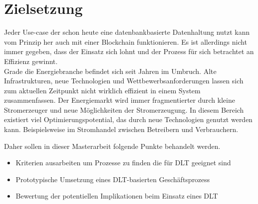 \section{Zielsetzung}

Jeder Use-case der schon heute eine datenbankbasierte Datenhaltung nutzt kann vom Prinzip her auch mit einer Blockchain funktionieren. Es ist allerdings nicht immer gegeben, dass der Einsatz sich lohnt und der Prozess für sich betrachtet an Effizienz gewinnt.\\

Grade die Energiebranche befindet sich seit Jahren im Umbruch. Alte Infrastrukturen, neue Technologien und Wettbewerbsanforderungen lassen sich zum aktuellen Zeitpunkt nicht wirklich effizient in einem System zusammenfassen. Der Energiemarkt wird immer fragmentierter durch kleine Stromerzeuger und neue Möglichkeiten der Stromerzeugung. In diesem Bereich existiert viel Optimierungspotential, das durch neue Technologien genutzt werden kann. Beispielsweise im Stromhandel zwischen Betreibern und Verbrauchern.

Daher sollen in dieser Masterarbeit folgende Punkte behandelt werden.

\begin{itemize}
	\item Kriterien ausarbeiten um Prozesse zu finden die für DLT geeignet sind
	\item Prototypische Umsetzung eines DLT-basierten Geschäftsprozess
	\item Bewertung der potentiellen Implikationen beim Einsatz eines DLT
\end{itemize}

\newpage